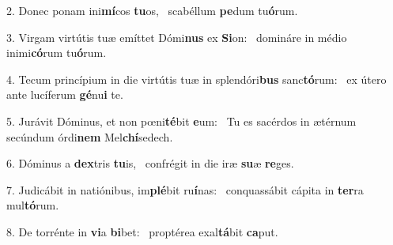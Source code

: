 2. Donec ponam ini\textbf{mí}cos \textbf{tu}os, \ast\  scabéllum \textbf{pe}dum tu\textbf{ó}rum.\

3. Virgam virtútis tuæ emíttet Dómi\textbf{nus} ex \textbf{Si}on: \ast\  domináre in médio inimi\textbf{có}rum tu\textbf{ó}rum.\

4. Tecum princípium in die virtútis tuæ in splendóri\textbf{bus} sanc\textbf{tó}rum: \ast\  ex útero ante lucíferum \textbf{gé}nu\textbf{i} te.\

5. Jurávit Dóminus, et non pœni\textbf{té}bit \textbf{e}um: \ast\  Tu es sacérdos in ætérnum secúndum órdi\textbf{nem} Mel\textbf{chí}sedech.\

6. Dóminus a \textbf{dex}tris \textbf{tu}is, \ast\  confrégit in die iræ \textbf{su}æ \textbf{re}ges.\

7. Judicábit in natiónibus, im\textbf{plé}bit ru\textbf{í}nas: \ast\  conquassábit cápita in \textbf{ter}ra mul\textbf{tó}rum.\

8. De torrénte in \textbf{vi}a \textbf{bi}bet: \ast\  proptérea exal\textbf{tá}bit \textbf{ca}put.\

